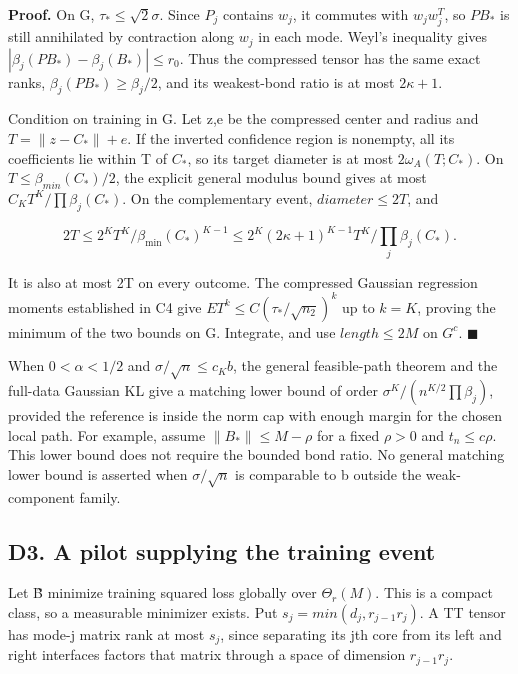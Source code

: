 \documentclass[
  11pt,
]{article}
\begin{document}
\textbf{Proof.} On G, \(\tau _*\le \sqrt 2\sigma\). Since \(P_j\)
contains \(w_j\), it commutes with \(w_jw_j^T\), so \(PB_*\) is still
annihilated by contraction along \(w_j\) in each mode. Weyl's inequality
gives \(|\beta _j(PB_*)-\beta _j(B_*)|\le r_0\). Thus the compressed
tensor has the same exact ranks, \(\beta _j(PB_*)\ge \beta _j/2\), and
its weakest-bond ratio is at most \(2\kappa +1\).

Condition on training in G. Let z,e be the compressed center and radius
and \(T=\|z-C_*\|+e\). If the inverted confidence region is nonempty,
all its coefficients lie within T of \(C_*\), so its target diameter is
at most \(2\omega _A(T;C_*)\). On \(T\le \beta _{min}(C_*)/2\), the
explicit general modulus bound gives at most
\(C_KT^K/\prod \beta _j(C_*)\). On the complementary event,
\(diameter\le 2T\), and

\[
 2T\le2^K T^K/\beta_{\min}(C_*)^{K-1}
 \le2^K(2\kappa+1)^{K-1}T^K/\prod_j\beta_j(C_*).
\]

It is also at most 2T on every outcome. The compressed Gaussian
regression moments established in C4 give
\(ET^k\le C(\tau _*/\sqrt{n_2})^k\) up to \(k=K\), proving the minimum
of the two bounds on G. Integrate, and use \(length\le 2M\) on \(G^c\).
\(\blacksquare\)

When \(0<\alpha <1/2\) and \(\sigma /\sqrt{n}\le c_Kb\), the general
feasible-path theorem and the full-data Gaussian KL give a matching
lower bound of order \(\sigma ^K/(n^{K/2}\prod \beta _j)\), provided the
reference is inside the norm cap with enough margin for the chosen local
path. For example, assume \(\|B_*\|\le M-\rho\) for a fixed \(\rho >0\)
and \(t_n\le c\rho\). This lower bound does not require the bounded bond
ratio. No general matching lower bound is asserted when
\(\sigma /\sqrt{n}\) is comparable to b outside the weak-component
family.

\subsection{D3. A pilot supplying the training
event}\label{d3.-a-pilot-supplying-the-training-event}

Let B̃ minimize training squared loss globally over \(\Theta _r(M)\).
This is a compact class, so a measurable minimizer exists. Put
\(s_j=min(d_j,r_{j-1}r_j)\). A TT tensor has mode-j matrix rank at most
\(s_j\), since separating its jth core from its left and right
interfaces factors that matrix through a space of dimension
\(r_{j-1}r_j\).
\end{document}
